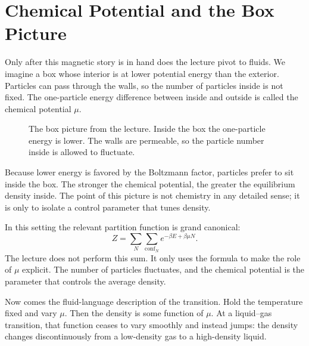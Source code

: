 \section{Chemical Potential and the Box Picture}

Only after this magnetic story is in hand does the lecture pivot to fluids. We imagine a box whose interior is at lower potential energy than the exterior. Particles can pass through the walls, so the number of particles inside is not fixed. The one-particle energy difference between inside and outside is called the chemical potential \(\mu\).

\begin{figure}[h]
\centering
{}
\caption{The box picture from the lecture. Inside the box the one-particle energy is lower. The walls are permeable, so the particle number inside is allowed to fluctuate.}
\end{figure}

Because lower energy is favored by the Boltzmann factor, particles prefer to sit inside the box. The stronger the chemical potential, the greater the equilibrium density inside. The point of this picture is not chemistry in any detailed sense; it is only to isolate a control parameter that tunes density.

In this setting the relevant partition function is grand canonical:
\begin{equation}
Z=\sum_N \sum_{\text{conf}_N} e^{-\beta E+\beta \mu N}.
\end{equation}
The lecture does not perform this sum. It only uses the formula to make the role of \(\mu\) explicit. The number of particles fluctuates, and the chemical potential is the parameter that controls the average density.

Now comes the fluid-language description of the transition. Hold the temperature fixed and vary \(\mu\). Then the density is some function of \(\mu\). At a liquid--gas transition, that function ceases to vary smoothly and instead jumps: the density changes discontinuously from a low-density gas to a high-density liquid.

